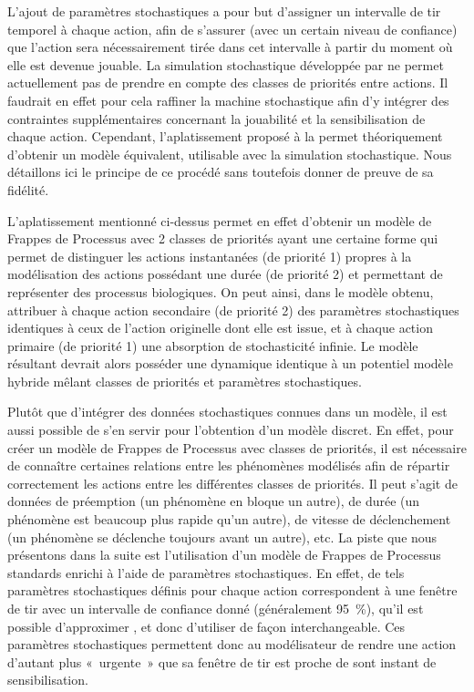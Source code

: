 \myskip

L'ajout de paramètres stochastiques a pour but d'assigner un intervalle de tir temporel à
chaque action, afin de s'assurer (avec un certain niveau de confiance) que l'action sera
nécessairement tirée dans cet intervalle à partir du moment où elle est devenue jouable.
La simulation stochastique développée par 
ne permet actuellement pas de prendre en compte des classes de priorités entre actions.
Il faudrait en effet pour cela raffiner la machine stochastique afin d'y intégrer des contraintes
supplémentaires concernant la jouabilité et la sensibilisation de chaque action.
Cependant, l'aplatissement proposé à la 
permet théoriquement d'obtenir un modèle équivalent,
utilisable avec la simulation stochastique.
Nous détaillons ici le principe de ce procédé sans toutefois donner de preuve de sa fidélité.

L'aplatissement mentionné ci-dessus permet en effet d'obtenir un modèle de Frappes de Processus
avec 2 classes de priorités ayant une certaine forme qui permet de distinguer
les actions instantanées (de priorité 1) propres à la modélisation
des actions possédant une durée (de priorité 2) et permettant de représenter des processus
biologiques.
On peut ainsi, dans le modèle obtenu, attribuer à chaque action secondaire (\cad de priorité 2)
des paramètres stochastiques identiques à ceux de l'action originelle dont elle est issue,
et à chaque action primaire (\cad de priorité 1) une absorption de stochasticité infinie.
Le modèle résultant devrait alors posséder une dynamique identique à un potentiel modèle hybride
mêlant classes de priorités et paramètres stochastiques.

\myskip

Plutôt que d'intégrer des données stochastiques connues dans un modèle,
il est aussi possible de s'en servir pour l'obtention d'un modèle discret.
En effet, pour créer un modèle de Frappes de Processus avec classes de priorités,
il est nécessaire de connaître certaines relations entre les phénomènes modélisés
afin de répartir correctement les actions entre les différentes classes de priorités.
Il peut s'agit de données de préemption (un phénomène en bloque un autre),
de durée (un phénomène est beaucoup plus rapide qu'un autre),
de vitesse de déclenchement (un phénomène se déclenche toujours avant un autre), etc.
La piste que nous présentons dans la suite est l'utilisation d'un modèle de Frappes de Processus
standards enrichi à l'aide de paramètres stochastiques.
En effet, de tels paramètres stochastiques définis pour chaque action correspondent
à une fenêtre de tir avec un intervalle de confiance donné (généralement 95~\%),
qu'il est possible d'approximer \cite[p.~72]{Pauleve11},
et donc d'utiliser de façon interchangeable.
Ces paramètres stochastiques permettent donc au modélisateur de rendre une action
d'autant plus «~urgente~» que sa fenêtre de tir est proche de sont instant
de sensibilisation.


